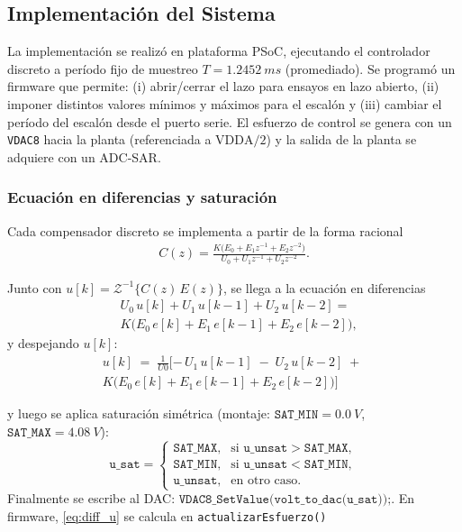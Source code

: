 \subsection{Implementación del Sistema}
La implementación se realizó en plataforma PSoC, ejecutando el controlador discreto a período fijo de muestreo \(T=\SI{1.2452}{ms}\) (promediado). Se programó un firmware que permite: (i) abrir/cerrar el lazo para ensayos en lazo abierto, (ii) imponer distintos valores mínimos y máximos para el escalón y (iii) cambiar el período del escalón desde el puerto serie. El esfuerzo de control se genera con un \texttt{VDAC8} hacia la planta (referenciada a \(\mathrm{VDDA}/2\)) y la salida de la planta se adquiere con un ADC-SAR.

\subsubsection{Ecuación en diferencias y saturación}
Cada compensador discreto se implementa a partir de la forma racional
\begin{equation}
	\label{eq:Cz_form}
	\begin{split}
		C(z)
		= \frac{K\big(E_0 + E_1 z^{-1} + E_2 z^{-2}\big)}
		{U_0 + U_1 z^{-1} + U_2 z^{-2}}.
	\end{split}
\end{equation}

Junto con \(u[k]=\mathcal{Z}^{-1}\!\big\{C(z)\,E(z)\big\}\), se llega a la ecuación en diferencias
\begin{equation}
	\label{eq:diff_balance}
	\begin{aligned}
		&U_0\,u[k] + U_1\,u[k-1] + U_2\,u[k-2]
		=\\
		 & K\Big(E_0\,e[k] + E_1\,e[k-1] + E_2\,e[k-2]\Big),
	\end{aligned}
\end{equation}
y despejando \(u[k]\):
\begin{equation}
	\label{eq:diff_u}
	\begin{split}
		u[k] \;=\;\frac{1}{U0}[
		-\,U_1\,u[k-1] \;-\; U_2\,u[k-2]
			\;+\; \\K\big(E_0\,e[k] + E_1\,e[k-1] + E_2\,e[k-2]\big)]
	\end{split}
\end{equation}


y luego se aplica saturación simétrica (montaje: \(\texttt{SAT\_MIN}=\SI{0.0}{V}\), \(\texttt{SAT\_MAX}=\SI{4.08}{V}\)):
\begin{equation}
	\label{eq:u_sat}
	\texttt{u\_sat}=
	\begin{cases}
		\texttt{SAT\_MAX}, & \text{si } \texttt{u\_unsat}>\texttt{SAT\_MAX},\\
		\texttt{SAT\_MIN}, & \text{si } \texttt{u\_unsat}<\texttt{SAT\_MIN},\\
		\texttt{u\_unsat}, & \text{en otro caso.}
	\end{cases}
\end{equation}
Finalmente se escribe al DAC: \(\texttt{VDAC8\_SetValue(volt\_to\_dac(u\_sat));}\).
En firmware, \eqref{eq:diff_u} se calcula en \texttt{actualizarEsfuerzo()}

